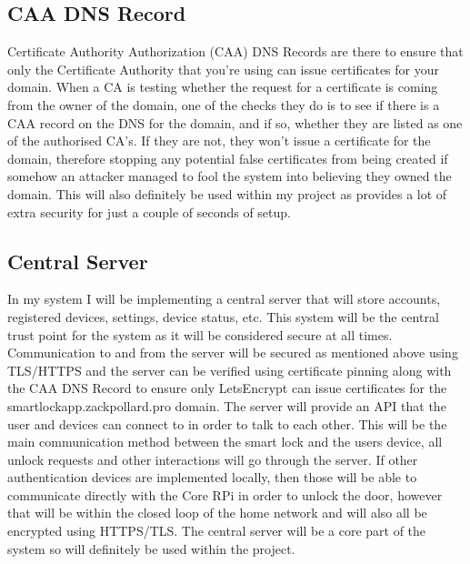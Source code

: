 \subsection{CAA DNS Record}
Certificate Authority Authorization (CAA) DNS Records are there to ensure that only the Certificate Authority that you're using can issue certificates for your domain. When a CA is testing whether the request for a certificate is coming from the owner of the domain, one of the checks they do is to see if there is a CAA record on the DNS for the domain, and if so, whether they are listed as one of the authorised CA's. If they are not, they won't issue a certificate for the domain, therefore stopping any potential false certificates from being created if somehow an attacker managed to fool the system into believing they owned the domain. This will also definitely be used within my project as provides a lot of extra security for just a couple of seconds of setup.

\subsection{Central Server}
In my system I will be implementing a central server that will store accounts, registered devices, settings, device status, etc. This system will be the central trust point for the system as it will be considered secure at all times. Communication to and from the server will be secured as mentioned above using TLS/HTTPS and the server can be verified using certificate pinning along with the CAA DNS Record to ensure only LetsEncrypt can issue certificates for the smartlockapp.zackpollard.pro domain. The server will provide an API that the user and devices can connect to in order to talk to each other. This will be the main communication method between the smart lock and the users device, all unlock requests and other interactions will go through the server. If other authentication devices are implemented locally, then those will be able to communicate directly with the Core RPi in order to unlock the door, however that will be within the closed loop of the home network and will also all be encrypted using HTTPS/TLS. The central server will be a core part of the system so will definitely be used within the project.

